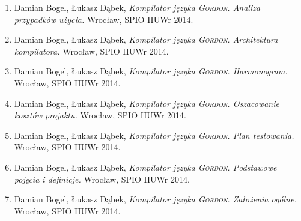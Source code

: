 \documentclass{documentation}
\begin{document}
\begin{enumerate}
    \item Damian Bogel, Łukasz Dąbek, \emph{Kompilator języka \textsc{Gordon}. Analiza przypadków użycia.} Wrocław, SPIO IIUWr 2014.
    \item Damian Bogel, Łukasz Dąbek, \emph{Kompilator języka \textsc{Gordon}. Architektura kompilatora.} Wrocław, SPIO IIUWr 2014.
    \item Damian Bogel, Łukasz Dąbek, \emph{Kompilator języka \textsc{Gordon}. Harmonogram.} Wrocław, SPIO IIUWr 2014.
    \item Damian Bogel, Łukasz Dąbek, \emph{Kompilator języka \textsc{Gordon}. Oszacowanie kosztów projaktu.} Wrocław, SPIO IIUWr 2014.
    \item Damian Bogel, Łukasz Dąbek, \emph{Kompilator języka \textsc{Gordon}. Plan testowania.} Wrocław, SPIO IIUWr 2014.
    \item Damian Bogel, Łukasz Dąbek, \emph{Kompilator języka \textsc{Gordon}. Podstawowe pojęcia i definicje.} Wrocław, SPIO IIUWr 2014.
    \item Damian Bogel, Łukasz Dąbek, \emph{Kompilator języka \textsc{Gordon}. Założenia ogólne.} Wrocław, SPIO IIUWr 2014.
\end{enumerate}
\end{document}
